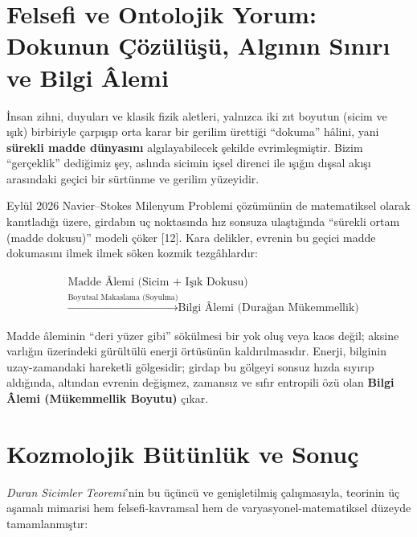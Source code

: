 \documentclass[12pt,a4paper]{article}
\begin{document}
\section{Felsefi ve Ontolojik Yorum: Dokunun Çözülüşü, Algının Sınırı ve Bilgi Âlemi}

İnsan zihni, duyuları ve klasik fizik aletleri, yalnızca iki zıt boyutun (sicim ve ışık) birbiriyle çarpışıp orta karar bir gerilim ürettiği ``dokuma'' hâlini, yani \textbf{sürekli madde dünyasını} algılayabilecek şekilde evrimleşmiştir. Bizim ``gerçeklik'' dediğimiz şey, aslında sicimin içsel direnci ile ışığın dışsal akışı arasındaki geçici bir sürtünme ve gerilim yüzeyidir.

Eylül 2026 Navier--Stokes Milenyum Problemi çözümünün de matematiksel olarak kanıtladığı üzere, girdabın uç noktasında hız sonsuza ulaştığında ``sürekli ortam (madde dokusu)'' modeli çöker [12]. Kara delikler, evrenin bu geçici madde dokumasını ilmek ilmek söken kozmik tezgâhlardır:

\[
\begin{aligned}
&\text{Madde Âlemi (Sicim + Işık Dokusu)} \\
&\xrightarrow{\text{Boyutsal Makaslama (Soyulma)}} \text{Bilgi Âlemi (Durağan Mükemmellik)}
\end{aligned}
\]

Madde âleminin ``deri yüzer gibi'' sökülmesi bir yok oluş veya kaos değil; aksine varlığın üzerindeki gürültülü enerji örtüsünün kaldırılmasıdır. Enerji, bilginin uzay-zamandaki hareketli gölgesidir; girdap bu gölgeyi sonsuz hızda sıyırıp aldığında, altından evrenin değişmez, zamansız ve sıfır entropili özü olan \textbf{Bilgi Âlemi (Mükemmellik Boyutu)} çıkar.

\section{Kozmolojik Bütünlük ve Sonuç}

\textit{Duran Sicimler Teoremi}'nin bu üçüncü ve genişletilmiş çalışmasıyla, teorinin üç aşamalı mimarisi hem felsefi-kavramsal hem de varyasyonel-matematiksel düzeyde tamamlanmıştır:
\end{document}
